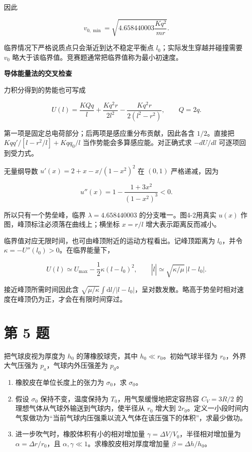 \documentclass[12pt,a4paper,UTF8]{ctexart}
\newcommand{\tightlist}{\setlength{\itemsep}{0pt}\setlength{\parskip}{0pt}}
\begin{document}
因此

\[\boxed{
v_{0,\min}
=\sqrt{4.658440003\frac{Kq^2}{mr}}
}.\]

临界情况下严格说质点只会渐近到达不稳定平衡点
\(l_0\)；实际发生穿越并碰撞需要 \(v_0\)
略大于该临界值。竞赛题通常把临界值称为最小初速度。

\textbf{导体能量法的交叉检查}

力积分得到的势能也可写成

\[U(l)=\frac{KQq}{l}
+\frac{Kq^2r}{2l^2}-\frac{Kq^2r}{2(l^2-r^2)},\qquad Q=2q.\]

第一项是固定总电荷部分；后两项是感应重分布贡献，因此各含 \(1/2\)。直接把
\(Kqq'/[l-r^2/l]+Kqq_0/l\) 当作势能会多算感应能。对正确式求 \(-dU/dl\)
可逐项回到受力式。

无量纲导数 \(u'(x)=2+x-x/(1-x^2)^2\) 在 \((0,1)\) 严格递减，因为

\[u''(x)=1-\frac{1+3x^2}{(1-x^2)^3}<0.\]

所以只有一个势垒峰，临界 \(\lambda=4.658440003\) 的分支唯一。图4-2用真实
\(u(x)\) 作图，峰顶标注必须落在曲线上；横坐标 \(x=r/l\)
增大表示距离反而减小。

临界值对应无限时间，也可由峰顶附近的运动方程看出。记峰顶距离为
\(l_0\)，并令 \(\kappa=-U''(l_0)>0\)。在临界能量下，

\[U(l)\simeq U_{\max}-\frac12\kappa(l-l_0)^2,
\qquad |\dot l|\simeq\sqrt{\kappa/\mu}\,|l-l_0|.\]

接近峰顶所需时间因此含
\(\sqrt{\mu/\kappa}\int\mathrm dl/|l-l_0|\)，呈对数发散。略高于势垒时相对速度在峰顶仍为正，才会在有限时间穿过。

\newpage

\section{第 5 题}\label{ux7b2c-5-ux9898}

把气球皮视为厚度为 \(h_0\) 的薄橡胶球壳，其中
\(h_0\ll r_0\)。初始气球半径为 \(r_0\)，外界大气压强为
\(p_a\)，气球内外压强差为 \(p_0\)。

\begin{enumerate}
\def\labelenumi{\arabic{enumi}.}
\tightlist
\item
  橡胶皮在单位长度上的张力为 \(\sigma_0\)，求 \(\sigma_0\)。
\item
  假设 \(\sigma_0\) 保持不变，温度保持为 \(T_0\)，用气泵缓慢地把定容热容
  \(C_V=3R/2\) 的理想气体从气球外输送到气球内，使半径从 \(r_0\) 增大到
  \(2r_0\)。定义一小段时间内气泵做功为``当前气球内压强乘以流入气体在该压强下的体积''，求最少做功。
\item
  进一步吹气时，橡胶体积有小的相对增加量
  \(\gamma=\Delta V/V_0\)，半径相对增加量为 \(\alpha=\Delta r/r_0\)，且
  \(\alpha,\gamma\ll1\)。求橡胶皮相对厚度增加量 \(\beta=\Delta h/h_0\)。
\end{enumerate}
\end{document}
